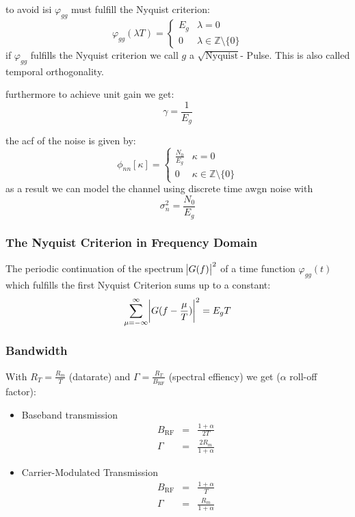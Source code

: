 to avoid \ac{isi} $\varphi_{gg}$ must fulfill the Nyquist criterion:
\begin{equation}
    \varphi_{gg}(\lambda T) =
    \begin{cases}
        E_g & \lambda = 0 \\
        0 & \lambda \in \mathbb{Z} \setminus \{0\}
    \end{cases}
\end{equation}
if $\varphi_{gg}$ fulfills the Nyquist criterion we call $g$ a $\sqrt{\text{Nyquist}}$-
Pulse. This is also called temporal orthogonality.

furthermore to achieve unit gain we get:
\begin{equation}
    \gamma = \frac{1}{E_g}
\end{equation}

the \ac{acf} of the noise is given by:
\begin{equation}
    \phi_{nn}[\kappa] =
    \begin{cases}
        \frac{N_0}{E_g} & \kappa = 0 \\
        0 & \kappa \in \mathbb{Z} \setminus \{0\}
    \end{cases}
\end{equation}
as a result we can model the channel using discrete time \ac{awgn} noise with
\begin{equation}
    \sigma_n^2 = \frac{N_0}{E_g}
\end{equation}

\subsubsection{The Nyquist Criterion in Frequency Domain}
The periodic continuation of the spectrum $\abs{G(f)}^2$ of a time function 
$\varphi_{gg}(t)$ which fulfills the first Nyquist Criterion sums up to a constant:
\begin{equation}
    \sum_{\mu=-\infty}^\infty \abs{G(f - \frac{\mu}{T})}^2 = E_g T
\end{equation}

\subsubsection{Bandwidth}
With $R_T = \frac{R_m}{T}$ (datarate) and $\Gamma = \frac{R_T}{B_\text{RF}}$ 
(spectral effiency) we get ($\alpha$ roll-off factor):
\begin{itemize}
    \item Baseband transmission
        \begin{eqnarray}
            B_\text{RF} &=& \frac{1 + \alpha}{2 T} \\
            \Gamma &=& \frac{2 R_m}{1 + \alpha}
        \end{eqnarray}
    \item Carrier-Modulated Transmission
        \begin{eqnarray}
            B_\text{RF} &=& \frac{1 + \alpha}{T} \\
            \Gamma &=& \frac{R_m}{1 + \alpha} 
        \end{eqnarray}
\end{itemize}

